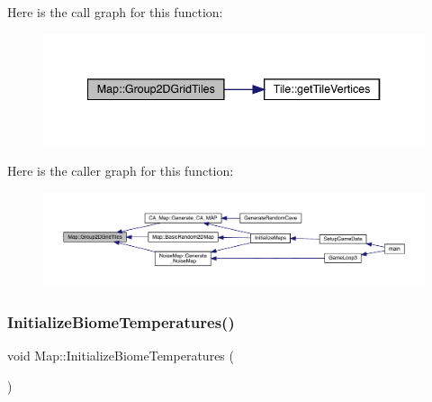 Here is the call graph for this function\+:
\nopagebreak
\begin{figure}[H]
\begin{center}
\leavevmode
\includegraphics[width=340pt]{class_map_af2b4481fa4588c8aa5ab6e8c45c5f7cf_cgraph}
\end{center}
\end{figure}
Here is the caller graph for this function\+:
\nopagebreak
\begin{figure}[H]
\begin{center}
\leavevmode
\includegraphics[width=350pt]{class_map_af2b4481fa4588c8aa5ab6e8c45c5f7cf_icgraph}
\end{center}
\end{figure}
\mbox{\label{class_map_ae5a05885aef979310e900b8343679abd}} 
\subsubsection{\texorpdfstring{Initialize\+Biome\+Temperatures()}{InitializeBiomeTemperatures()}}
{\footnotesize\ttfamily void Map\+::\+Initialize\+Biome\+Temperatures (\begin{DoxyParamCaption}{ }\end{DoxyParamCaption})}

